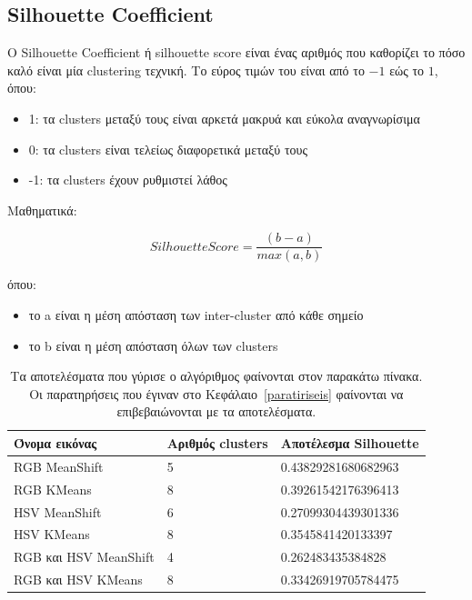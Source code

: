 \subsection{Silhouette Coefficient}

Ο Silhouette Coefficient ή silhouette score είναι ένας αριθμός που καθορίζει το πόσο καλό είναι μία clustering τεχνική. Το εύρος τιμών του είναι από το $ -1 $ εώς το $ 1 $, όπου:

\begin{itemize}
  \item 1: τα clusters μεταξύ τους είναι αρκετά μακρυά και εύκολα αναγνωρίσιμα
  \item 0: τα clusters είναι τελείως διαφορετικά μεταξύ τους
  \item -1: τα clusters έχουν ρυθμιστεί λάθος
\end{itemize}

Μαθηματικά:

\begin{equation}
  SilhouetteScore = \frac{(b - a)}{max(a, b)}
\end{equation}

όπου:

\begin{itemize}
  \item το a είναι η μέση απόσταση των inter-cluster από κάθε σημείο
  \item το b είναι η μέση απόσταση όλων των clusters
\end{itemize}

\begin{table}[H]
  \centering
	\begin{tabular}{ | p{4cm} | p{4cm} | p{6cm} | }
		\hline
		\textbf{Όνομα εικόνας} & \textbf{Αριθμός clusters} & \textbf{Αποτέλεσμα Silhouette} \\
		\hline
		RGB MeanShift & 5 & 0.43829281680682963 \\
		\hline
		RGB KMeans & 8 & 0.39261542176396413 \\
		\hline
		HSV MeanShift & 6 & 0.27099304439301336 \\
		\hline
    HSV KMeans & 8 & 0.3545841420133397 \\
    \hline
    RGB και HSV MeanShift & 4 & 0.262483435384828 \\
    \hline
    RGB και HSV KMeans & 8 & 0.33426919705784475 \\
    \hline
	\end{tabular}
  \caption[Αποτελέσματα Silhouette]{Tα αποτελέσματα που γύρισε ο αλγόριθμος φαίνονται στον παρακάτω πίνακα. Οι παρατηρήσεις που έγιναν στο Κεφάλαιο~\ref{paratiriseis} φαίνονται να επιβεβαιώνονται με τα αποτελέσματα.}
  \label{tab:silhouette}
\end{table}

